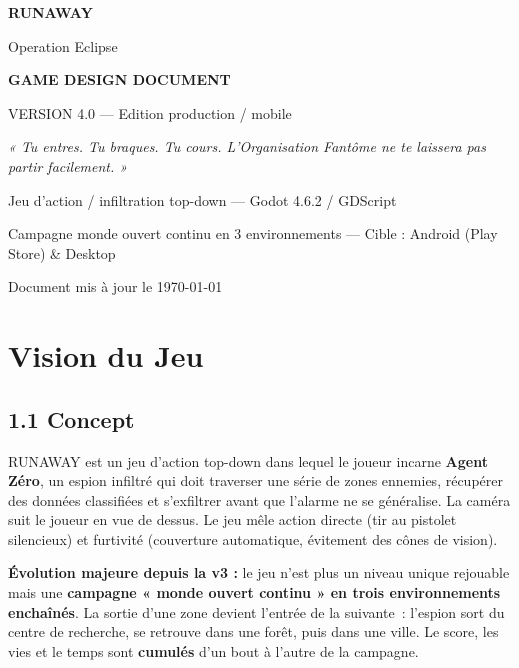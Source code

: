 \documentclass[11pt,a4paper]{article}
\begin{document}
\begin{titlepage}
\centering
\vspace*{3cm}
{\Huge\bfseries\color{eclipsered} RUNAWAY\par}
\vspace{0.5cm}
{\LARGE Operation Eclipse\par}
\vspace{2cm}
{\Large\bfseries GAME DESIGN DOCUMENT\par}
\vspace{0.3cm}
{\large VERSION 4.0 --- Edition production / mobile\par}
\vspace{2cm}
\begin{minipage}{0.8\textwidth}\centering\itshape
« Tu entres. Tu braques. Tu cours. L'Organisation Fant\^ome ne te laissera
pas partir facilement. »
\end{minipage}
\vfill
{\small Jeu d'action / infiltration top-down --- Godot 4.6.2 / GDScript\par}
{\small Campagne monde ouvert continu en 3 environnements --- Cible : Android (Play Store) \& Desktop\par}
\vspace{0.5cm}
{\small Document mis \`a jour le \today\par}
\end{titlepage}

\tableofcontents
\newpage

\section{Vision du Jeu}

\subsection{1.1 Concept}
RUNAWAY est un jeu d'action top-down dans lequel le joueur incarne \textbf{Agent
Z\'ero}, un espion infiltr\'e qui doit traverser une s\'erie de zones ennemies,
r\'ecup\'erer des donn\'ees classifi\'ees et s'exfiltrer avant que l'alarme ne se
g\'en\'eralise. La cam\'era suit le joueur en vue de dessus. Le jeu m\^ele action
directe (tir au pistolet silencieux) et furtivit\'e (couverture automatique,
\'evitement des c\^ones de vision).

\textbf{\'Evolution majeure depuis la v3 :} le jeu n'est plus un niveau unique
rejouable mais une \textbf{campagne « monde ouvert continu » en trois
environnements encha\^in\'es}. La sortie d'une zone devient l'entr\'ee de la
suivante~: l'espion sort du centre de recherche, se retrouve dans une for\^et,
puis dans une ville. Le score, les vies et le temps sont \textbf{cumul\'es} d'un
bout \`a l'autre de la campagne.
\end{document}
